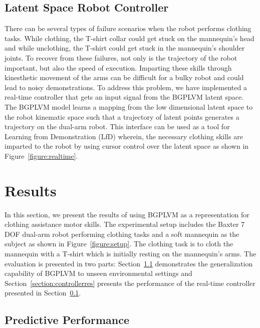 \documentclass{article}
\begin{document}
\subsection{Latent Space Robot Controller}
\label{section:controller}

There can be several types of failure scenarios when the robot performs clothing tasks. While clothing, the T-shirt collar could get stuck on the mannequin's head and while unclothing, the T-shirt could get stuck in the mannequin's shoulder joints. To recover from these failures, not only is the trajectory of the robot important, but also the speed of execution. Imparting these skills through kinesthetic movement of the arms can be difficult for a bulky robot and could lead to noisy demonstrations. To address this problem, we have implemented a real-time controller that gets an input signal from the BGPLVM latent space. The BGPLVM model learns a mapping from the low dimensional latent space to the robot kinematic space such that a trajectory of latent points generates a trajectory on the dual-arm robot. This interface can be used as a tool for Learning from Demonstration (LfD) wherein, the necessary clothing skills are imparted to the robot by using cursor control over the latent space as shown in Figure~\ref{figure:realtime}.

\section{Results}
\label{section:results}

In this section, we present the results of using BGPLVM as a representation for clothing assistance motor skills. The experimental setup includes the Baxter 7 DOF dual-arm robot performing clothing tasks and a soft mannequin as the subject as shown in Figure~\ref{figure:setup}. The clothing task is to cloth the mannequin with a T-shirt which is initially resting on the mannequin's arms. The evaluation is presented in two parts: Section~\ref{section:performance} demonstrates the generalization capability of BGPLVM to unseen environmental settings and Section~\ref{section:controllerres} presents the performance of the real-time controller presented in Section~\ref{section:controller}.

\subsection{Predictive Performance}
\label{section:performance}
\end{document}
